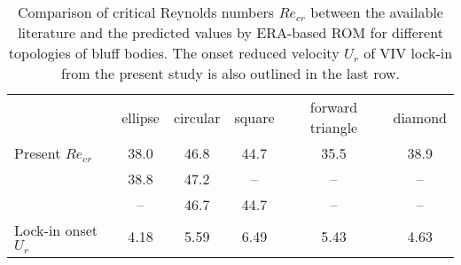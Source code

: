\documentclass{jfm}
\begin{document}

\begin{table}
  \begin{center}
  \begin{tabular}{l c c c c c}
                        &ellipse &circular &square &forward triangle  &diamond\\
       Present $Re_{cr}$               & 38.0 & 46.8 & 44.7 & 35.5 & 38.9 \\
       \cite{Thompson2014}   & 38.8 & 47.2 & --   & --   & --   \\
       \cite{Park2016}       & --   & 46.7 & 44.7 & --   & --   \\
       Lock-in onset $U_r$   & 4.18 & 5.59 & 6.49 & 5.43 & 4.63
  \end{tabular}
  \caption{Comparison of critical Reynolds numbers  $Re_{cr}$ between 
  the available literature and the
  predicted values by ERA-based ROM for different topologies of bluff bodies.
  The onset reduced velocity $U_r$ of VIV lock-in from the present study 
  is also outlined in the last row.
  }
  \label{tab:Recr_topology}
  \end{center}
\end{table}
\end{document}
